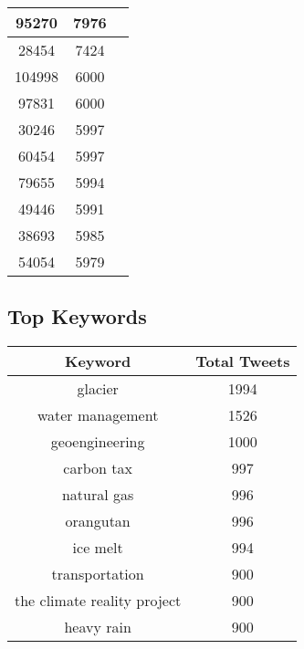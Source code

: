 \documentclass{article}\usepackage[T1]{fontenc}
\begin{document}
\begin{tabular}{|c|c|c|}
 \hline
95270 & 7976\\ 
 \hline
28454 & 7424\\ 
 \hline
104998 & 6000\\ 
 \hline
97831 & 6000\\ 
 \hline
30246 & 5997\\ 
 \hline
60454 & 5997\\ 
 \hline
79655 & 5994\\ 
 \hline
49446 & 5991\\ 
 \hline
38693 & 5985\\ 
 \hline
54054 & 5979\\ 
 \hline
\end{tabular}\subsection*{Top Keywords}\begin{tabular}{|c|c|}         \hline         Keyword & Total Tweets \\ 
 \hline
glacier & 1994\\ 
 \hline
water management & 1526\\ 
 \hline
geoengineering & 1000\\ 
 \hline
carbon tax & 997\\ 
 \hline
natural gas & 996\\ 
 \hline
orangutan & 996\\ 
 \hline
ice melt & 994\\ 
 \hline
transportation & 900\\ 
 \hline
the climate reality project & 900\\ 
 \hline
heavy rain & 900\\ 
 \hline
\end{tabular}
\end{document}
